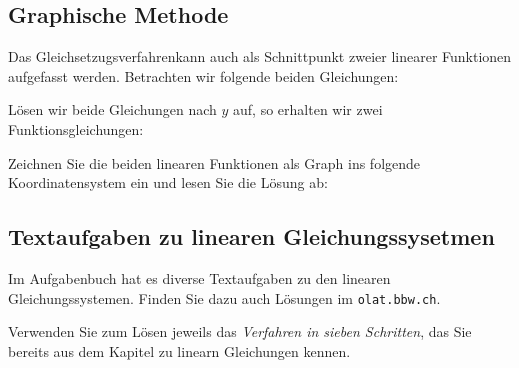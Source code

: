 
\subsection{Graphische Methode}
Das Gleichsetzugsverfahrenkann auch als Schnittpunkt zweier linearer Funktionen
aufgefasst werden. Betrachten wir folgende beiden Gleichungen:


Lösen wir beide Gleichungen nach $y$ auf, so erhalten wir zwei Funktionsgleichungen:



Zeichnen Sie die beiden linearen Funktionen als Graph ins folgende
Koordinatensystem ein und lesen Sie die Lösung  ab:

\newpage


\newpage


\GESO{}
\newpage

\TALS{
\newpage}


\newpage

\TALS{
  \newpage}

\TALS{
\newpage}



\subsection{Textaufgaben zu linearen Gleichungssysetmen}
Im Aufgabenbuch hat es diverse Textaufgaben zu den linearen
Gleichungssystemen. Finden Sie dazu auch Lösungen im
\texttt{olat.bbw.ch}.

Verwenden Sie zum Lösen jeweils das \textit{Verfahren in sieben
Schritten}, das Sie bereits aus dem Kapitel zu linearn Gleichungen kennen.



\newpage

